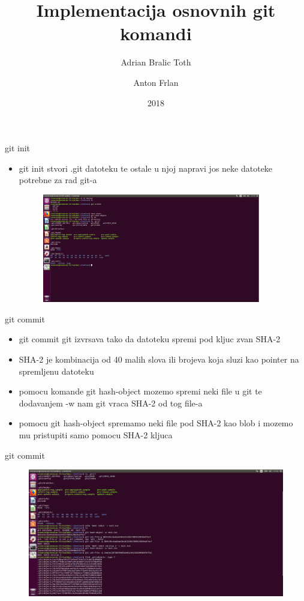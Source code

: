 \documentclass[]{beamer}
\title{Implementacija osnovnih git komandi}
\author{Adrian Bralic Toth \and Anton Frlan}
\institute{Tehnički Fakultet Rijeka}
\date{2018}
\begin{document}
\frame{\titlepage}

\begin{frame}{git init}

\begin{itemize}
	\setlength\itemsep{2em}
	\item git init stvori .git datoteku te ostale u njoj napravi jos neke datoteke potrebne za rad git-a
	\begin{figure}
\centering
\includegraphics[width=0.9\textwidth]{./slike/git_datoteka.jpg}
\end{figure}
\end{itemize}

\end{frame}


\begin{frame}{git commit}

\begin{itemize}
	\setlength\itemsep{2.5em}
	\item git commit git izvrsava tako da datoteku spremi pod kljuc zvan SHA-2
	\item SHA-2 je kombinacija od 40 malih slova ili brojeva koja sluzi kao pointer na spremljenu datoteku
	\item pomocu komande git hash-object mozemo spremi neki file u git te dodavanjem -w nam git vraca SHA-2 od tog file-a
	\item pomocu git hash-object spremamo neki file pod SHA-2 kao blob i mozemo mu pristupiti samo pomocu SHA-2 kljuca
\end{itemize}

\end{frame}

\begin{frame}{git commit}
\begin{figure}
\centering
\includegraphics[width=1\textwidth]{./slike/druga_slika.jpg}
\end{figure}

\end{frame}
\end{document}

